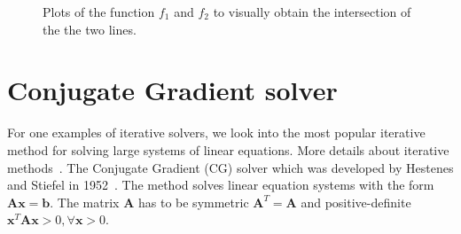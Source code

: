 \begin{figure}[tb]
\centering
{}
\caption{Plots of the function $f_1$ and $f_2$ to visually obtain the intersection of the the two lines.}
\label{fig:example:interesction}
\end{figure}

\section{Conjugate Gradient solver}
For one examples of iterative solvers, we look into the most popular iterative method for solving large systems of linear equations. More details about iterative methods~\cite{olshanskii2014iterative,briggs2000multigrid}. The Conjugate Gradient (CG) solver which was developed by Hestenes and Stiefel in 1952~\cite{hestenes1952methods}. The method solves linear equation systems with the form $\mathbf{A} \mathbf{x} = \mathbf{b}$. The matrix $\mathbf{A}$ has to be symmetric $\mathbf{A}^T = \mathbf{A}$ and positive-definite $\mathbf{x}^T \mathbf{A} \mathbf{x} > 0, \forall \mathbf{x}>0$. \\

